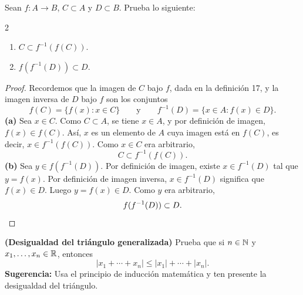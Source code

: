 \documentclass[12pt,a4paper]{article}
\begin{document}
    \begin{problema}
        Sean $f:A\rightarrow B$, $C\subset A$ y $D\subset B$. Prueba lo siguiente:
        \begin{multicols}{2}
            \begin{enumerate}
                \item[(a)] $C\subset f^{-1}\left(f\left(C\right)\right).$
                \item[(b)] $f\left(f^{-1}\left(D\right)\right)\subset D.$
            \end{enumerate}
        \end{multicols}
    \end{problema}

    \begin{proof}
        Recordemos que la imagen de $C$ bajo $f$, dada en la definición 17, y la imagen inversa de $D$ bajo $f$ son los conjuntos
        \begin{equation*}
            f(C)=\{f(x):x\in C\}\qquad\text{y}\qquad f^{-1}(D)=\{x\in A:f(x)\in D\}.
        \end{equation*}
        \textbf{(a)} Sea $x\in C$. Como $C\subset A$, se tiene $x\in A$, y por definición de imagen, $f(x)\in f(C)$. Así, $x$ es un elemento de $A$ cuya imagen está en $f(C)$, es decir, $x\in f^{-1}(f(C))$. Como $x\in C$ era arbitrario,
        \begin{equation*}
            C\subset f^{-1}(f(C)).
        \end{equation*}
        \textbf{(b)} Sea $y\in f(f^{-1}(D))$. Por definición de imagen, existe $x\in f^{-1}(D)$ tal que $y=f(x)$. Por definición de imagen inversa, $x\in f^{-1}(D)$ significa que $f(x)\in D$. Luego $y=f(x)\in D$. Como $y$ era arbitrario,
        \begin{equation*}
            f(f^{-1}(D))\subset D.\qedhere
        \end{equation*}
    \end{proof}

    \begin{problema}
        \textbf{(Desigualdad del triángulo generalizada)} Prueba que si $n\in\mathbb{N}$ y $x_{1},\ldots,x_{n}\in\mathbb{R}$, entonces
        \begin{equation*}
            \left|x_{1}+\cdots+x_{n}\right|\leq\left|x_{1}\right|+\cdots+\left|x_{n}\right|.
        \end{equation*}
        \textbf{Sugerencia:} Usa el principio de inducción matemática y ten presente la desigualdad del triángulo.
    \end{problema}
\end{document}
